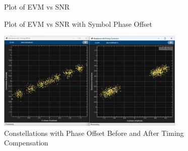 \documentclass{article}
\begin{document}
\begin{figure}[H]
	\centerline{}
	\caption{Plot of EVM vs SNR}
	\label{fig::evm_vs_snr}
\end{figure}

\begin{figure}[H]
	\centerline{}
	\caption{Plot of EVM vs SNR with Symbol Phase Offset}
	\label{fig::evm_vs_snr_with_phase_offset}
\end{figure}

\begin{figure}[H]
	\centerline{\includegraphics[width=0.8\textwidth]{constellations_with_timing_correction_phase_offset.png}}
	\caption{Constellations with Phase Offset Before and After Timing Compensation}
	\label{fig::constellations_with_timing_correction_phase_offset}
\end{figure}
\end{document}
